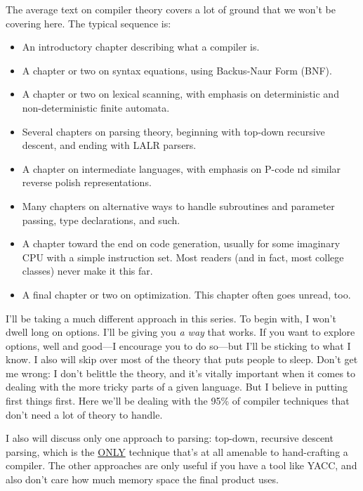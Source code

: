\documentclass[float=false, crop=false]{standalone}
\begin{document}
The average text on compiler theory covers a lot of ground that we won't be
covering here. The typical sequence is:

\begin{itemize}
\item An introductory chapter describing what a compiler is.

\item A chapter or two on syntax equations, using Backus-Naur Form (BNF).

\item A chapter or two on lexical scanning, with emphasis on
      deterministic and non-deterministic finite automata.

\item Several chapters on parsing theory, beginning with top-down recursive
      descent, and ending with LALR parsers.

\item A chapter on intermediate languages, with emphasis on P-code
      nd similar reverse polish representations.

\item Many chapters on alternative ways to handle subroutines and
      parameter passing, type declarations, and such.

\item A chapter toward the end on code generation, usually for some
      imaginary CPU with a simple instruction set.  Most readers
      (and in fact, most college classes) never make it this far.

\item A final chapter or two on optimization. This chapter often goes unread,
      too.
\end{itemize}

I'll be taking a much different approach in this series. To begin with, I won't
dwell long on options. I'll be giving you \textit{a way} that works. If you want to
explore options, well and good---I encourage you to do so---but I'll be
sticking to what I know. I also will skip over most of the theory that puts
people to sleep. Don't get me wrong: I don't belittle the theory, and it's
vitally important when it comes to dealing with the more tricky parts of a given
language. But I believe in putting first things first. Here we'll be dealing
with the 95\% of compiler techniques that don't need a lot of theory to handle.

I also will discuss only one approach to parsing: top-down, recursive descent
parsing, which is the \underline{ONLY} technique that's at all amenable to hand-crafting a
compiler. The other approaches are only useful if you have a tool like YACC, and
also don't care how much memory space the final product uses.
\end{document}

